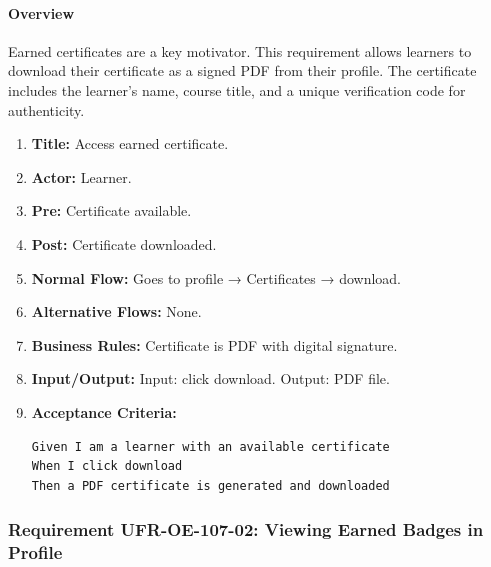 \paragraph{Overview}
Earned certificates are a key motivator. This requirement allows learners to download their certificate as a signed PDF from their profile. The certificate includes the learner’s name, course title, and a unique verification code for authenticity.
\begin{enumerate}[label=\textbf{\arabic*.}]
\item \textbf{Title:} Access earned certificate.
\item \textbf{Actor:} Learner.
\item \textbf{Pre:} Certificate available.
\item \textbf{Post:} Certificate downloaded.
\item \textbf{Normal Flow:} Goes to profile → Certificates → download.
\item \textbf{Alternative Flows:} None.
\item \textbf{Business Rules:} Certificate is PDF with digital signature.
\item \textbf{Input/Output:} Input: click download. Output: PDF file.
\item \textbf{Acceptance Criteria:}
    \begin{verbatim}
Given I am a learner with an available certificate
When I click download
Then a PDF certificate is generated and downloaded
    \end{verbatim}
\end{enumerate}

\subsubsection{Requirement UFR-OE-107-02: Viewing Earned Badges in Profile}

